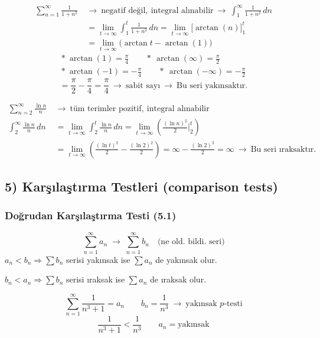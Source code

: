 \documentclass[11pt,a4paper]{article}
\begin{document}
\begin{align*}
\sum_{n=1}^{\infty}\frac{1}{1+n^2}\ &\to\ \text{negatif değil},\ \text{integral alınabilir}\ \to\ \int_{1}^{\infty}\frac{1}{1+n^2}\,dn\\
&=\lim_{t\to\infty}\int_{1}^{t}\frac{1}{1+n^2}\,dn=\lim_{t\to\infty}\Big[\arctan(n)\Big]_{1}^{t}\\
&=\lim_{t\to\infty}\big(\arctan t-\arctan(1)\big)
\end{align*}
\begin{gather*}
{*}\ \arctan(1)=\tfrac{\pi}{4}\qquad {*}\ \arctan(\infty)=\tfrac{\pi}{2}\\
{*}\ \arctan(-1)=-\tfrac{\pi}{4}\qquad {*}\ \arctan(-\infty)=-\tfrac{\pi}{2}
\end{gather*}
\[ {}=\frac{\pi}{2}-\frac{\pi}{4}=\frac{\pi}{4}\ \to\ \text{sabit sayı}\ \to\ \text{Bu seri yakınsaktır.} \]

\begin{align*}
\sum_{n=2}^{\infty}\frac{\ln n}{n}\ &\to\ \text{tüm terimler pozitif},\ \text{integral alınabilir}\\
\int_{2}^{\infty}\frac{\ln n}{n}\,dn&=\lim_{t\to\infty}\int_{2}^{t}\frac{\ln n}{n}\,dn=\lim_{t\to\infty}\left(\frac{(\ln n)^2}{2}\Big|_{2}^{t}\right)\\
&=\lim_{t\to\infty}\left(\frac{(\ln t)^2}{2}-\frac{(\ln 2)^2}{2}\right)=\infty-\frac{(\ln 2)^2}{2}=\infty\ \to\ \text{Bu seri ıraksaktır.}
\end{align*}

\subsection{5) Karşılaştırma Testleri (comparison tests)}
\subsubsection{Doğrudan Karşılaştırma Testi (5.1)}
\[ \sum_{n=1}^{\infty}a_n \;\longrightarrow\; \sum_{n=1}^{\infty}b_n \quad\text{(ne old. bildi. seri)} \]
$a_n<b_n \Rightarrow \sum b_n$ serisi yakınsak ise $\sum a_n$ de yakınsak olur.

$b_n<a_n \Rightarrow \sum b_n$ serisi ıraksak ise $\sum a_n$ de ıraksak olur.

\[ \sum_{n=1}^{\infty}\frac{1}{n^3+1}=a_n \qquad b_n=\frac{1}{n^3}\ \to\ \text{yakınsak $p$-testi} \]
\[ \frac{1}{n^3+1}<\frac{1}{n^3} \qquad a_n=\text{yakınsak} \]
\end{document}
